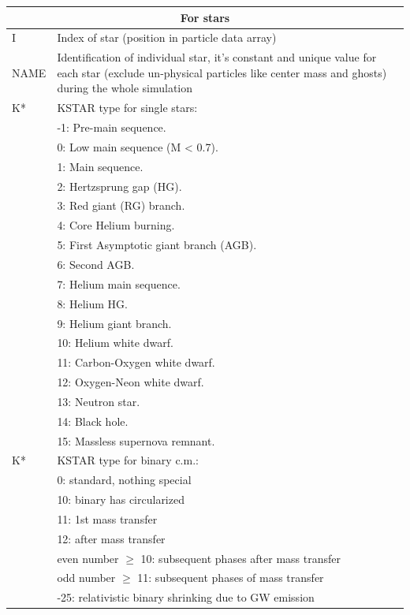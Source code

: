 \begin{longtable}{|p{0.7in}|p{4.3in}|}
    \multicolumn{2}{|c|}{ For stars } \\\hline
    I     & Index of star (position in particle data array) \\\hline
    NAME  & Identification of individual star, it's constant and unique value for each star (exclude un-physical particles like center mass and ghosts) during the whole simulation \\\hline
    K*    & KSTAR type for single stars:   \\
          &-1: Pre-main sequence. \\
          & 0: Low main sequence (M < 0.7). \\
          & 1: Main sequence. \\
          & 2: Hertzsprung gap (HG). \\
          & 3: Red giant (RG) branch. \\
          & 4: Core Helium burning. \\
          & 5: First Asymptotic giant branch (AGB). \\
          & 6: Second AGB. \\
          & 7: Helium main sequence. \\
          & 8: Helium HG. \\
          & 9: Helium giant branch. \\
          &10: Helium white dwarf. \\
          &11: Carbon-Oxygen white dwarf. \\
          &12: Oxygen-Neon white dwarf. \\
          &13: Neutron star. \\
          &14: Black hole. \\
          &15: Massless supernova remnant. \\\hline
    K*    & KSTAR type for binary c.m.:   \\
          &  0: standard, nothing special \\
          &  10: binary has circularized \\
          &  11: 1st mass transfer \\
          &  12: after mass transfer \\
          &  even number $\ge$ 10: subsequent phases after mass transfer \\
          &  odd number $\ge$ 11: subsequent phases of mass transfer \\
          &  -25: relativistic binary shrinking due to GW emission    \\

\end{longtable}
